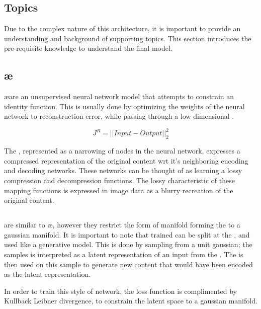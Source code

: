\documentclass{article}
\begin{document}
\begin{multicols}{2}

\section{Topics}

Due to the complex nature of this architecture, it is important to provide an
understanding and background of supporting topics. This section introduces the
pre-requisite knowledge to understand the final model.

\subsection{\ae}
\ae are an unsupervised neural network model that attempts to constrain an
identity function. This is usually done by optimizing the weights of the neural
network to reconstruction error, while passing through a low dimensional \bottle.

\[J^{R}=||Input - Output||^2_2\]

The \bottle, represented as a narrowing of nodes in the neural network, expresses
a compressed representation of the original content wrt it's neighboring encoding and
decoding networks. These networks can be thought of as learning a lossy compression
and decompression functions. The lossy characteristic of these mapping functions is
expressed in image data as a blurry recreation of the original content.

\resizebox{.8\columnwidth}{!}{}




\subsection{\vae}

\vae are similar to \ae, however they restrict the form of manifold forming the
\bottle to a gaussian manifold. It is important to note that trained \vae
can be split at the \bottle, and used like a generative model. This is
done by sampling from a unit gaussian; the samples is interpreted as a latent
representation of an input from the \encoder. The \decoder is then used on this sample
to generate new content that would have been encoded as the latent representation.

In order to train this style of network, the loss function is complimented by
Kullback Leibner divergence, to constrain the latent space to a gaussian manifold.


\end{multicols}
\end{document}
